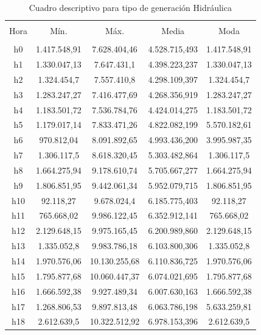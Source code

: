 \documentclass[conference, 10pt]{IEEEtran}
\begin{document}
\begin{table}[!htbp] \centering 
  \caption{Cuadro descriptivo para tipo de generación Hidráulica} 
  \label{} 
\begin{tabular}{@{\extracolsep{5pt}} ccccc} 
\\[-1.8ex]\hline 
\hline \\[-1.8ex] 
Hora & Mín. & Máx. & Media & Moda \\ 
\hline \\[-1.8ex] 
h0 & 1.417.548,91 & 7.628.404,46 & 4.528.715,493& 1.417.548,91 \\ 
h1 & 1.330.047,13 & 7.647.431,1 & 4.398.223,237& 1.330.047,13 \\ 
h2 & 1.324.454,7 & 7.557.410,8 & 4.298.109,397& 1.324.454,7 \\ 
h3 & 1.283.247,27 & 7.416.477,69 & 4.268.356,919& 1.283.247,27 \\ 
h4 & 1.183.501,72 & 7.536.784,76 & 4.424.014,275& 1.183.501,72 \\ 
h5 & 1.179.017,14 & 7.833.471,26 & 4.822.082,199& 5.570.182,61 \\ 
h6 & 970.812,04 & 8.091.892,65 & 4.993.436,200& 3.995.987,35 \\ 
h7 & 1.306.117,5 & 8.618.320,45 & 5.303.482,864& 1.306.117,5 \\ 
h8 & 1.664.275,94 & 9.178.610,74 & 5.705.667,277& 1.664.275,94 \\ 
h9 & 1.806.851,95 & 9.442.061,34 & 5.952.079,715& 1.806.851,95 \\ 
h10 & 92.118,27 & 9.678.024,4 & 6.185.775,403& 92.118,27 \\ 
h11 & 765.668,02 & 9.986.122,45 & 6.352.912,141& 765.668,02 \\ 
h12 & 2.129.648,15 & 9.975.165,45 & 6.200.989,860& 2.129.648,15 \\ 
h13 & 1.335.052,8 & 9.983.786,18 & 6.103.800,306& 1.335.052,8 \\ 
h14 & 1.970.576,06 & 10.130.255,68 & 6.110.836,725& 1.970.576,06 \\ 
h15 & 1.795.877,68 & 10.060.447,37 & 6.074.021,695& 1.795.877,68 \\ 
h16 & 1.666.592,38 & 9.927.489,34 & 6.007.630,163& 1.666.592,38 \\ 
h17 & 1.268.806,53 & 9.897.813,48 & 6.063.786,198& 5.633.259,81 \\ 
h18 & 2.612.639,5 & 10.322.512,92 & 6.978.153,396& 2.612.639,5 \\ 

\end{tabular}
\end{table}
\end{document}
